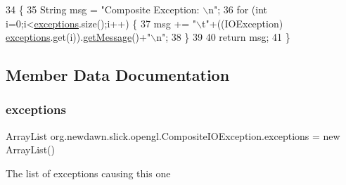 \begin{DoxyCode}
34                                \{
35         String msg = \textcolor{stringliteral}{"Composite Exception: \(\backslash\)n"};
36         \textcolor{keywordflow}{for} (\textcolor{keywordtype}{int} i=0;i<\mbox{\hyperlink{classorg_1_1newdawn_1_1slick_1_1opengl_1_1_composite_i_o_exception_af43e5dc3fe90a30ae72aab39b866349a}{exceptions}}.size();i++) \{
37             msg += \textcolor{stringliteral}{"\(\backslash\)t"}+((IOException) \mbox{\hyperlink{classorg_1_1newdawn_1_1slick_1_1opengl_1_1_composite_i_o_exception_af43e5dc3fe90a30ae72aab39b866349a}{exceptions}}.get(i)).\mbox{\hyperlink{classorg_1_1newdawn_1_1slick_1_1opengl_1_1_composite_i_o_exception_a2e50a6e1acf81ff82b05214c2c04b1f8}{getMessage}}()+\textcolor{stringliteral}{"\(\backslash\)n"};
38         \}
39         
40         \textcolor{keywordflow}{return} msg;
41     \}
\end{DoxyCode}


\subsection{Member Data Documentation}
\mbox{\label{classorg_1_1newdawn_1_1slick_1_1opengl_1_1_composite_i_o_exception_af43e5dc3fe90a30ae72aab39b866349a}} 
\subsubsection{\texorpdfstring{exceptions}{exceptions}}
{\footnotesize\ttfamily Array\+List org.\+newdawn.\+slick.\+opengl.\+Composite\+I\+O\+Exception.\+exceptions = new Array\+List()\hspace{0.3cm}{\ttfamily [private]}}

The list of exceptions causing this one 